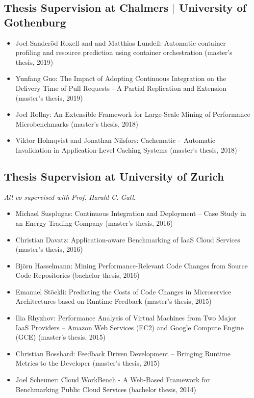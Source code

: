 \documentclass[paper=letter,fontsize=11pt]{scrartcl} %
\begin{document}
\subsection*{Thesis Supervision at Chalmers $|$ University of Gothenburg}

\begin{itemize}
	\item Joel Sanderöd Roxell and and Matthias Lundell: Automatic container profiling
and resource prediction using container orchestration (master's thesis, 2019)
	\item Yunfang Guo: The Impact of Adopting Continuous Integration on the Delivery Time of Pull Requests - A Partial Replication and Extension (master's thesis, 2019)
	\item Joel Rollny: An Extensible Framework for Large-Scale Mining of Performance Microbenchmarks (master's thesis, 2018)
  \item Viktor Holmqvist and Jonathan Nilsfors: Cachematic - Automatic Invalidation in Application-Level Caching Systems (master's thesis, 2018)
\end{itemize}

\subsection*{Thesis Supervision at University of Zurich}

\emph{All co-supervised with Prof. Harald C. Gall.}

\begin{itemize}
  \item Michael Susplugas: Continuous Integration and Deployment -- Case Study in an Energy Trading Company (master's thesis, 2016)
	\item Christian Davatz: Application-aware Benchmarking of IaaS Cloud Services (master's thesis, 2016)
	\item Bj\"orn Hasselmann: Mining Performance-Relevant Code Changes from Source Code Repositories (bachelor thesis, 2016)
  \item Emanuel St\"ockli: Predicting the Costs of Code Changes in Microservice Architectures based on Runtime Feedback  (master's thesis, 2015)
  \item Ilia Rhyzhov: Performance Analysis of Virtual Machines from Two Major IaaS Providers -- Amazon Web Services (EC2) and Google Compute Engine (GCE)  (master's thesis, 2015)
  \item Christian Bosshard: Feedback Driven Development -- Bringing Runtime Metrics to the Developer  (master's thesis, 2015)
  \item Joel Scheuner: Cloud WorkBench - A Web-Based Framework for Benchmarking Public Cloud Services (bachelor thesis, 2014)
\end{itemize}
\end{document}
